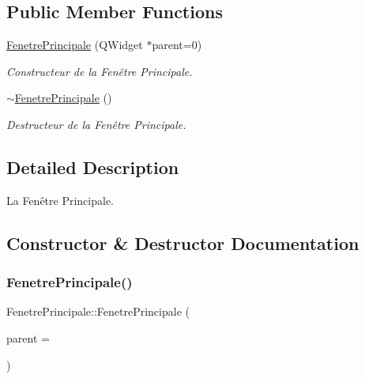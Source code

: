 \subsection*{Public Member Functions}
\begin{DoxyCompactItemize}
\item 
\hyperlink{classFenetrePrincipale_aab8cf15535ca6934db27e5e45e2b6d7b}{Fenetre\+Principale} (Q\+Widget $\ast$parent=0)
\begin{DoxyCompactList}\small\item\em Constructeur de la Fenêtre Principale. \end{DoxyCompactList}\item 
\hyperlink{classFenetrePrincipale_afb035ceb7a4f1ddd23ab6213b582efa1}{$\sim$\+Fenetre\+Principale} ()
\begin{DoxyCompactList}\small\item\em Destructeur de la Fenêtre Principale. \end{DoxyCompactList}\end{DoxyCompactItemize}


\subsection{Detailed Description}
La Fenêtre Principale. 

\subsection{Constructor \& Destructor Documentation}
\mbox{\label{classFenetrePrincipale_aab8cf15535ca6934db27e5e45e2b6d7b}} 
\subsubsection{\texorpdfstring{Fenetre\+Principale()}{FenetrePrincipale()}}
{\footnotesize\ttfamily Fenetre\+Principale\+::\+Fenetre\+Principale (\begin{DoxyParamCaption}\item[{Q\+Widget $\ast$}]{parent = {} }\end{DoxyParamCaption})\hspace{0.3cm}{\ttfamily [explicit]}}



